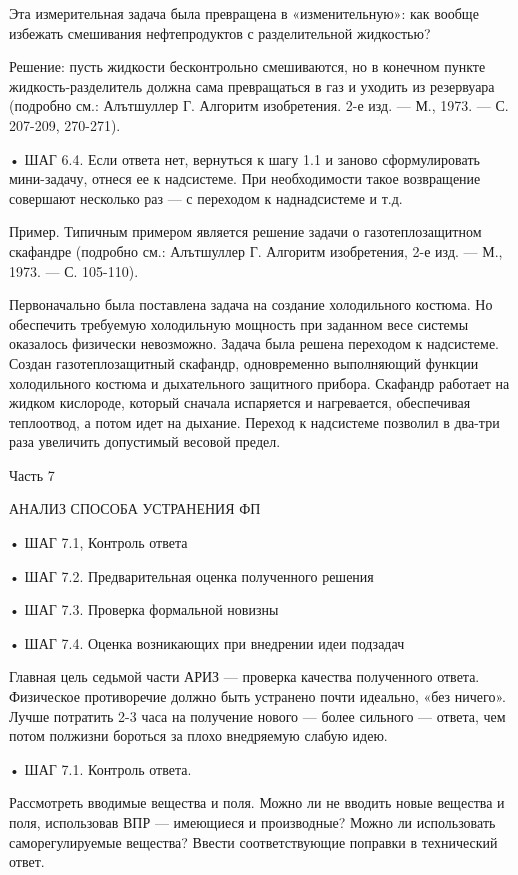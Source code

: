 Эта измерительная задача была превращена в «изменительную»: как вообще
избежать смешивания нефтепродуктов с разделительной жидкостью?

Решение:  пусть  жидкости  бесконтрольно смешиваются,  но  в  конечном
пункте жидкость-разделитель  должна сама превращаться в  газ и уходить
из резервуара  (подробно см.: Алътшуллер Г.  Алгоритм изобретения. 2-е
изд. — М., 1973. — С. 207-209, 270-271).

•  ШАГ  6.4.   Если  ответа  нет,  вернуться  к  шагу   1.1  и  заново
сформулировать мини-задачу, отнеся ее  к надсистеме. При необходимости
такое   возвращение  совершают   несколько   раз  —   с  переходом   к
наднадсистеме и т.д.

Пример. Типичным примером является  решение задачи о газотеплозащитном
скафандре (подробно см.: Алътшуллер  Г. Алгоритм изобретения, 2-е изд.
— М., 1973. — С. 105-110).

Первоначально была поставлена задача на создание холодильного костюма.
Но  обеспечить  требуемую  холодильную   мощность  при  заданном  весе
системы оказалось  физически невозможно. Задача была  решена переходом
к   надсистеме.   Создан  газотеплозащитный   скафандр,   одновременно
выполняющий  функции  холодильного  костюма и  дыхательного  защитного
прибора.  Скафандр  работает  на  жидком  кислороде,  который  сначала
испаряется  и нагревается,  обеспечивая  теплоотвод, а  потом идет  на
дыхание.  Переход  к  надсистеме  позволил в  два-три  раза  увеличить
допустимый весовой предел.


Часть 7

АНАЛИЗ СПОСОБА УСТРАНЕНИЯ ФП

• ШАГ 7.1, Контроль ответа

• ШАГ 7.2. Предварительная оценка полученного решения

• ШАГ 7.3. Проверка формальной новизны

• ШАГ 7.4. Оценка возникающих при внедрении идеи подзадач


Главная  цель  седьмой  части  АРИЗ —  проверка  качества  полученного
ответа. Физическое противоречие должно  быть устранено почти идеально,
«без ничего».  Лучше потратить  2-3 часа на  получение нового  — более
сильного —  ответа, чем  потом полжизни  бороться за  плохо внедряемую
слабую идею.

• ШАГ 7.1. Контроль ответа.

Рассмотреть  вводимые  вещества и  поля.  Можно  ли не  вводить  новые
вещества  и поля,  использовав ВПР  — имеющиеся  и производные?  Можно
ли  использовать  саморегулируемые  вещества?  Ввести  соответствующие
поправки в технический ответ.


